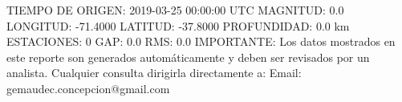 \documentclass[a4paper,12pt]{article}%
\begin{document}
%
\newline%
\newline%
\newline%
TIEMPO DE ORIGEN: 2019{-}03{-}25 00:00:00 UTC\newline%
MAGNITUD: 0.0\newline%
LONGITUD: {-}71.4000\newline%
LATITUD: {-}37.8000\newline%
PROFUNDIDAD: 0.0 km\newline%
ESTACIONES: 0\newline%
GAP: 0.0\newline%
RMS: 0.0\newline%
%
IMPORTANTE: Los datos mostrados en este reporte son generados automáticamente y deben ser revisados por un analista. Cualquier consulta dirigirla directamente a:\newline%
%
Email: gemaudec.concepcion@gmail.com%
\end{document}

